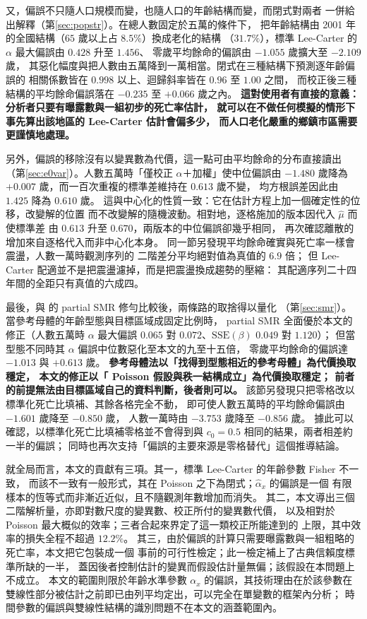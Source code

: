 \documentclass[UTF8, fontset=macnew, a4paper, 12pt]{ctexart}
\begin{document}
又，偏誤不只隨人口規模而變，也隨人口的年齡結構而變，而閉式對兩者
一併給出解釋（第\ref{sec:popstr}）。在總人數固定於五萬的條件下，
把年齡結構由 2001 年的全國結構（$65$ 歲以上占 $8.5\%$）換成老化的結構
（$31.7\%$），標準 Lee-Carter 的 $\alpha$ 最大偏誤由 $0.428$ 升至 $1.456$、
零歲平均餘命的偏誤由 $-1.055$ 歲擴大至 $-2.109$ 歲，
其惡化幅度與把人數由五萬降到一萬相當。閉式在三種結構下預測逐年齡偏誤的
相關係數皆在 $0.998$ 以上、迴歸斜率皆在 $0.96$ 至 $1.00$ 之間，
而校正後三種結構的平均餘命偏誤落在 $-0.235$ 至 $+0.066$ 歲之內。
\textbf{這對使用者有直接的意義：分析者只要有曝露數與一組初步的死亡率估計，
就可以在不做任何模擬的情形下事先算出該地區的 Lee-Carter 估計會偏多少，
而人口老化嚴重的鄉鎮市區需要更謹慎地處理。}

另外，偏誤的移除沒有以變異數為代價，這一點可由平均餘命的分布直接讀出
（第\ref{sec:e0var}）。人數五萬時「僅校正 $\alpha$＋加權」使中位偏誤由
$-1.480$ 歲降為 $+0.007$ 歲，而一百次重複的標準差維持在 $0.613$ 歲不變，
均方根誤差因此由 $1.425$ 降為 $0.610$ 歲。
這與中心化的性質一致：它在估計方程上加一個確定性的位移，改變解的位置
而不改變解的隨機波動。相對地，逐格施加的版本因代入 $\hat\mu$ 而使標準差
由 $0.613$ 升至 $0.670$，兩版本的中位偏誤卻幾乎相同，
再次確認離散的增加來自逐格代入而非中心化本身。
同一節另發現平均餘命確實與死亡率一樣會震盪，人數一萬時觀測序列的
二階差分平均絕對值為真值的 $6.9$ 倍；
但 Lee-Carter 配適並不是把震盪濾掉，而是把震盪換成趨勢的壓縮：
其配適序列二十四年間的全距只有真值的六成四。

最後，與 \citet{lee2003}的 partial SMR 修勻比較後，兩條路的取捨得以量化
（第\ref{sec:smr}）。當參考母體的年齡型態與目標區域成固定比例時，
partial SMR 全面優於本文的修正（人數五萬時 $\alpha$ 最大偏誤 $0.065$
對 $0.072$、$\mathrm{SSE}(\beta)$ $0.049$ 對 $1.120$）；
但當型態不同時其 $\alpha$ 偏誤中位數惡化至本文的九至十五倍，
零歲平均餘命的偏誤達 $-1.013$ 與 $+0.613$ 歲。
\textbf{參考母體法以「找得到型態相近的參考母體」為代價換取穩定，
本文的修正以「 Poisson 假設與秩一結構成立」為代價換取穩定；
前者的前提無法由目標區域自己的資料判斷，後者則可以。}
該節另發現只把零格改以標準化死亡比填補、其餘各格完全不動，
即可使人數五萬時的平均餘命偏誤由 $-1.601$ 歲降至 $-0.850$ 歲，
人數一萬時由 $-3.753$ 歲降至 $-0.856$ 歲。
據此可以確認，以標準化死亡比填補零格並不會得到與
$c_0=0.5$ 相同的結果，兩者相差約一半的偏誤；
同時也再次支持「偏誤的主要來源是零格替代」這個推導結論。

就全局而言，本文的貢獻有三項。其一，標準 Lee-Carter 的年齡參數 Fisher 不一致，
而該不一致有一般形式，其在 Poisson 之下為閉式；$\hat\alpha_x$ 的偏誤是一個
有限樣本的恆等式而非漸近近似，且不隨觀測年數增加而消失。
其二，本文導出三個二階解析量，亦即對數尺度的變異數、校正所付的變異數代價，
以及相對於 Poisson 最大概似的效率；三者合起來界定了這一類校正所能達到的
上限，其中效率的損失全程不超過 $12.2\%$。
其三，由於偏誤的計算只需要曝露數與一組粗略的死亡率，本文把它包裝成一個
事前的可行性檢定；此一檢定補上了古典信賴度標準所缺的一半，
蓋因後者控制估計的變異而假設估計量無偏；該假設在本問題上不成立。
本文的範圍則限於年齡水準參數 $\alpha_x$ 的偏誤，其技術理由在於該參數在
雙線性部分被估計之前即已由列平均定出，可以完全在單變數的框架內分析；
時間參數的偏誤與雙線性結構的識別問題不在本文的涵蓋範圍內。
\end{document}
